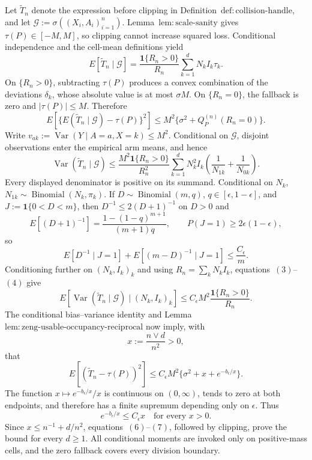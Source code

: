 Let \(\widetilde T_n\) denote the expression before clipping in Definition~\(\mathrm{def:collision\text{-}handle}\), and let \(\mathcal G:=\sigma((X_i,A_i)_{i=1}^n)\).  Lemma~\(\mathrm{lem:scale\text{-}sanity}\) gives \(\tau(P)\in[-M,M]\), so clipping cannot increase squared loss.  Conditional independence and the cell-mean definitions yield
\[
 E[\widetilde T_n\mid\mathcal G]
 =\frac{\mathbf 1\{R_n>0\}}{R_n}\sum_{k=1}^dN_kI_k\tau_k.
\tag{1}
\]
On \(\{R_n>0\}\), subtracting \(\tau(P)\) produces a convex combination of the deviations \(\delta_k\), whose absolute value is at most \(\sigma M\).  On \(\{R_n=0\}\), the fallback is zero and \(|\tau(P)|\le M\).  Therefore
\[
 E\!\left[\{E(\widetilde T_n\mid\mathcal G)-\tau(P)\}^2\right]
 \le M^2\{\sigma^2+Q_P^{(n)}(R_n=0)\}.
\tag{2}
\]
Write \(v_{ak}:=\operatorname{Var}(Y\mid A=a,X=k)\le M^2\).  Conditional on \(\mathcal G\), disjoint observations enter the empirical arm means, and hence
\[
 \operatorname{Var}(\widetilde T_n\mid\mathcal G)
 \le \frac{M^2\mathbf 1\{R_n>0\}}{R_n^2}
 \sum_{k=1}^dN_k^2I_k\left(\frac1{N_{1k}}+\frac1{N_{0k}}\right).
\tag{3}
\]
Every displayed denominator is positive on its summand.  Conditional on \(N_k\), \(N_{1k}\sim\operatorname{Binomial}(N_k,\pi_k)\).  If \(D\sim\operatorname{Binomial}(m,q)\), \(q\in[\epsilon,1-\epsilon]\), and \(J:=\mathbf1\{0<D<m\}\), then \(D^{-1}\le2(D+1)^{-1}\) on \(D>0\) and
\[
 E[(D+1)^{-1}]=\frac{1-(1-q)^{m+1}}{(m+1)q},
 \qquad P(J=1)\ge2\epsilon(1-\epsilon),
\]
so
\[
 E[D^{-1}\mid J=1]+E[(m-D)^{-1}\mid J=1]
 \le \frac{C_{\epsilon}}m.
\tag{4}
\]
Conditioning further on \((N_k,I_k)_k\) and using \(R_n=\sum_kN_kI_k\), equations~\((3)\)--\((4)\) give
\[
 E[\operatorname{Var}(\widetilde T_n\mid\mathcal G)\mid(N_k,I_k)_k]
 \le C_{\epsilon}M^2\frac{\mathbf1\{R_n>0\}}{R_n}.
\tag{5}
\]
The conditional bias--variance identity and Lemma~\(\mathrm{lem:zeng\text{-}usable\text{-}occupancy\text{-}reciprocal}\) now imply, with
\[
 x:=\frac{n\vee d}{n^2}>0,
\]
that
\[
 E[(\widetilde T_n-\tau(P))^2]
 \le C_{\epsilon}M^2\{\sigma^2+x+e^{-b_{\epsilon}/x}\}.
\tag{6}
\]
The function \(x\mapsto e^{-b_{\epsilon}/x}/x\) is continuous on \((0,\infty)\), tends to zero at both endpoints, and therefore has a finite supremum depending only on \(\epsilon\).  Thus
\[
 e^{-b_{\epsilon}/x}\le C_{\epsilon}x
 \quad\text{for every }x>0.
\tag{7}
\]
Since \(x\le n^{-1}+d/n^2\), equations~\((6)\)--\((7)\), followed by clipping, prove the bound for every \(d\ge1\).  All conditional moments are invoked only on positive-mass cells, and the zero fallback covers every division boundary.